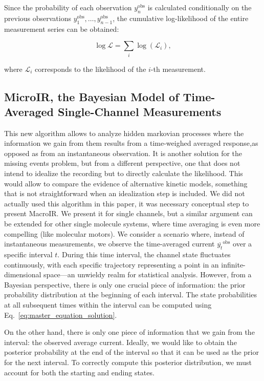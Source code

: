 \documentclass[pdflatex,sn-mathphys-num]{sn-jnl}%
\theoremstyle{thmstyleone}%
\theoremstyle{thmstyletwo}%
\theoremstyle{thmstylethree}%
\begin{document}
Since the probability of each observation \( {y}_n^{\text{obs}} \) is calculated conditionally on the previous observations \( {y}_1^{\text{obs}}, \dots, {y}_{n-1}^{\text{obs}} \), the cumulative log-likelihood of the entire measurement series can be obtained:

\begin{equation}
	\log \mathcal{L} = \sum_i \log (\mathcal{L}_i),
	\label{eq:total_loglikelihood}
\end{equation}

where \( \mathcal{L}_i \) corresponds to the likelihood of the \( i \)-th measurement.


\subsection{MicroIR, the Bayesian Model of Time-Averaged Single-Channel Measurements}

This new algorithm allows to analyze hidden markovian processes where the information we gain from them results from a time-weighed averaged response,as opposed as from an instantaneous observation. It is another solution for the missing events problem, but from a different perspective, one that does not intend to idealize the recording but to directly calculate the likelihood. This would allow to compare the evidence of alternative kinetic models, something that is not straightforward when an idealization step is included.  
We did not actually used this algorithm in this paper, it was necessary conceptual step to present MacroIR. We present it for single channels, but a similar argument can be extended for other single molecule systems, where time averaging is even more compelling (like molecular motors). 
We consider a scenario where, instead of instantaneous measurements, we observe the time-averaged current \( \overline{y_t}^{\text{obs}} \) over a specific interval \( t \). During this time interval, the channel state fluctuates continuously, with each specific trajectory representing a point in an infinite-dimensional space—an unwieldy realm for statistical analysis. However, from a Bayesian perspective, there is only one crucial piece of information: the prior probability distribution at the beginning of each interval. The state probabilities at all subsequent times within the interval can be computed using Eq.~\ref{eq:master_equation_solution}. 

On the other hand, there is only one piece of information that we gain from the interval: the observed average current. Ideally, we would like to obtain the posterior probability at the end of the interval so that it can be used as the prior for the next interval. To correctly compute this posterior distribution, we must account for both the starting and ending states.
\end{document}
